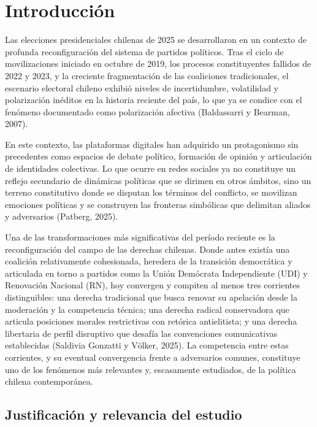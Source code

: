 \documentclass[
  letterpaper,
  numbers=noendperiod,
  fontsize=11pt,
  DIV=12,
  titlepage=false]{scrreprt}
\begin{document}
\chapter{Introducción}\label{introducciuxf3n}

Las elecciones presidenciales chilenas de 2025 se desarrollaron en un
contexto de profunda reconfiguración del sistema de partidos políticos.
Tras el ciclo de movilizaciones iniciado en octubre de 2019, los
procesos constituyentes fallidos de 2022 y 2023, y la creciente
fragmentación de las coaliciones tradicionales, el escenario electoral
chileno exhibió niveles de incertidumbre, volatilidad y polarización
inéditos en la historia reciente del país, lo que ya se condice con el
fenómeno documentado como polarización afectiva (Baldassarri y Bearman,
2007).

En este contexto, las plataformas digitales han adquirido un
protagonismo sin precedentes como espacios de debate político, formación
de opinión y articulación de identidades colectivas. Lo que ocurre en
redes sociales ya no constituye un reflejo secundario de dinámicas
políticas que se dirimen en otros ámbitos, sino un terreno constitutivo
donde se disputan los términos del conflicto, se movilizan emociones
políticas y se construyen las fronteras simbólicas que delimitan aliados
y adversarios (Patberg, 2025).

Una de las transformaciones más significativas del período reciente es
la reconfiguración del campo de las derechas chilenas. Donde antes
existía una coalición relativamente cohesionada, heredera de la
transición democrática y articulada en torno a partidos como la Unión
Demócrata Independiente (UDI) y Renovación Nacional (RN), hoy convergen
y compiten al menos tres corrientes distinguibles: una derecha
tradicional que busca renovar su apelación desde la moderación y la
competencia técnica; una derecha radical conservadora que articula
posiciones morales restrictivas con retórica antielitista; y una derecha
libertaria de perfil disruptivo que desafía las convenciones
comunicativas establecidas (Saldivia Gonzatti y Völker, 2025). La
competencia entre estas corrientes, y su eventual convergencia frente a
adversarios comunes, constituye uno de los fenómenos más relevantes y,
escasamente estudiados, de la política chilena contemporánea.

\section{Justificación y relevancia del
estudio}\label{justificaciuxf3n-y-relevancia-del-estudio}
\end{document}
